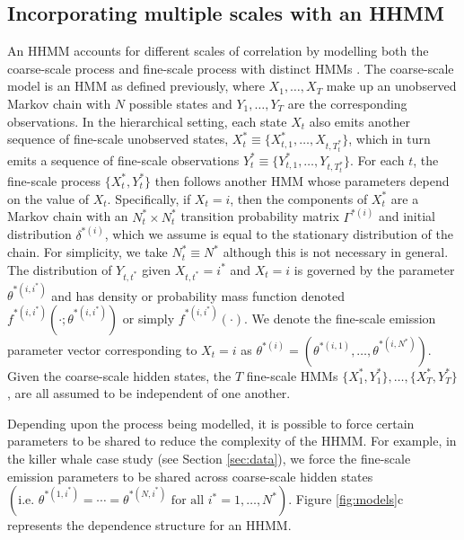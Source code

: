 \subsection{Incorporating multiple scales with an HHMM}

An HHMM accounts for different scales of correlation by modelling both the coarse-scale process and fine-scale process with distinct HMMs \citep{Barajas:2017,Adam:2019}. The coarse-scale model is an HMM as defined previously, where $X_1, \ldots, X_T$ make up an unobserved Markov chain with $N$ possible states and $Y_1,\ldots, Y_T$ are the corresponding observations.   
%
In the hierarchical setting, each state $X_t$ also emits another sequence of fine-scale unobserved states, $X_t^* \equiv \{X_{t,1}^*,\ldots, X_{t,T_t^*}\}$, which in turn emits a sequence of fine-scale observations $Y_t^* \equiv \{Y_{t,1}^*,\ldots, Y_{t,T_t^*}\}$. For each $t$, the fine-scale process $\{X_t^*, Y_t^*\}$ then follows another HMM whose parameters depend on the value of $X_t$. Specifically, if $X_t=i$, then the components of $X_t^*$ are a Markov chain with an $N^*_t \times N^*_t$ transition probability matrix $\Gamma^{*(i)}$ and initial distribution $\delta^{*(i)}$, which we assume is equal to the stationary distribution of the chain. For simplicity, we take $N_t^* \equiv N^*$ although this is not necessary in general. The distribution of $Y_{t,t^*}$ given $X_{t,t^*}=i^*$ and $X_t=i$ is governed by the parameter $\theta^{*(i,i^*)}$ and has density or probability mass function denoted $f^{*(i,i^*)}\left(\cdot; \theta^{*(i,i^*)}\right)$ or simply $f^{*(i,i^*)}(\cdot)$. We denote the fine-scale emission parameter vector corresponding to $X_t=i$ as $\theta^{*(i)}=\left(\theta^{*(i,1)}, \ldots, \theta^{*(i,N^*)}\right)$. Given the coarse-scale hidden states, the $T$ fine-scale HMMs $\{X_1^*, Y_1^*\}, \ldots, \{X_T^*, Y_T^*\}$, are all assumed to be independent of one another.

Depending upon the process being modelled, it is possible to force certain parameters to be shared to reduce the complexity of the HHMM. For example, in the killer whale case study (see Section \ref{sec:data}), we force the fine-scale emission parameters to be shared across coarse-scale hidden states $\left( \text{i.e. } \theta^{*(1,i^*)} = \cdots = \theta^{*(N,i^*)} \text{ for all } i^* = 1, \ldots, N^* \right)$. Figure \ref{fig:models}c represents the dependence structure for an HHMM. 

